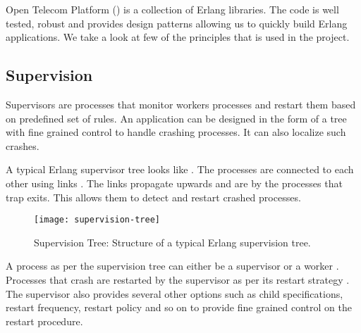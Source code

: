 Open Telecom Platform () is a collection of Erlang libraries.
The  code is
well tested, robust and provides design patterns allowing us to quickly build
Erlang applications. We take a look at few of the  principles
that is used in the project.

\subsection{Supervision}
\label{section:concepts.supervision}

Supervisors are processes that monitor workers processes and restart them based
on predefined set of rules. An application can be designed in the form of a
tree with fine grained control to handle crashing processes. It can also
localize such crashes.

A typical Erlang supervisor tree looks like . The
processes are connected to each other using links%
. The links propagate upwards and are  by the processes that trap
exits. This allows them to detect and restart crashed processes.

\begin{figure}
  \texttt{[image: supervision-tree]}
  \caption[Supervision Tree]{%
    Supervision Tree: Structure of a typical Erlang supervision tree.}
  \label{figure:supervision.tree}
  \normalcaption
\end{figure}

A process as per the supervision tree can either be a supervisor%
or a worker%
. Processes that crash are restarted by the supervisor as per its
restart strategy%
. The supervisor also provides several other options such as child
specifications, restart frequency, restart policy and so on to provide
fine grained control on the restart procedure.

